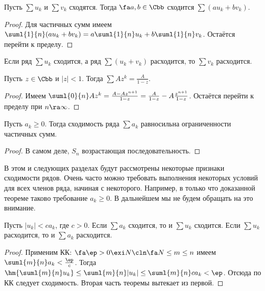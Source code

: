 \documentclass[a4paper]{article}
\begin{document}
\begin{theorem}
Пусть $\sum u_k$ и $\sum v_k$ сходятся. Тогда $\fa a,b \in \Cbb$ сходится $\sum(au_k+bv_k)$.
\end{theorem}
\begin{proof}
Для частичных сумм имеем $\suml{1}{n}(au_k+bv_k)=a\suml{1}{n}u_k + b\suml{1}{n}v_k$. Остаётся перейти к пределу.
\end{proof}

\begin{note}
Если ряд $\sum u_k$ сходится, а ряд $\sum (u_k+v_k)$ расходится, то $\sum v_k$ расходится.
\end{note}

\begin{theorem}
Пусть $z \in \Cbb$ и $|z|<1$. Тогда $\sum Az^k = \frac{A}{1-z}$.
\end{theorem}
\begin{proof}
Имеем $\suml{0}{n} Az^k = \frac{A-Az^{n+1}}{1-z}=\frac{A}{1-z}-A\frac{z^{n+1}}{1-z}$. Остаётся перейти к пределу при $n\ra\infty$.
\end{proof}

\begin{theorem}
Пусть $a_k \ge 0$. Тогда сходимость ряда $\sum a_k$ равносильна ограниченности частичных сумм.
\end{theorem}
\begin{proof}
В самом деле, $S_n$ возрастающая последовательность.
\end{proof}

\begin{note}
В этом и следующих разделах будут рассмотрены некоторые признаки сходимости рядов. Очень часто можно требовать выполнения некоторых условий
для всех членов ряда, начиная с некоторого. Например, в только что доказанной теореме таково требование $a_k \ge 0$. В дальнейшем мы не будем
обращать на это внимание.
\end{note}

\begin{theorem}
Пусть $|u_k| < ca_k$, где $c>0$. Если $\sum a_k$ сходится, то и $\sum u_k$ сходится. Если $\sum u_k$
расходится, то и $\sum a_k$ расходится.
\end{theorem}
\begin{proof}
Применим КК: $\fa \ep > 0 \exi N\cln \fa N \le m \le n$ имеем $\suml{m}{n} a_k < \frac{\ep}{c}$. Тогда
$\hm{\suml{m}{n} u_k} \le \suml{m}{n} |u_k| \le \suml{m}{n}ca_k < \ep$. Отсюда по КК следует сходимость. Вторая часть теоремы вытекает из первой.
\end{proof}
\end{document}
